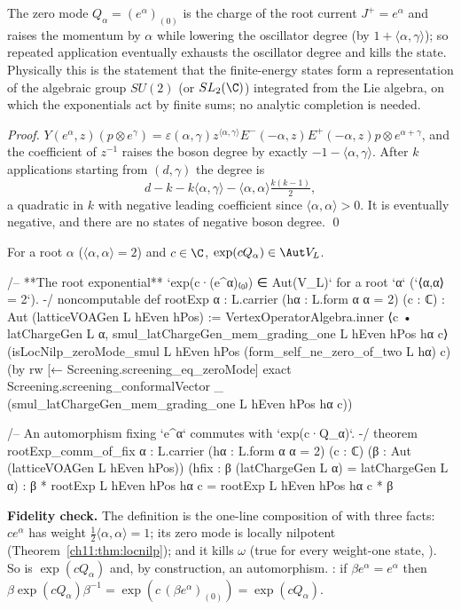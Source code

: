 \begin{physics}
The zero mode $Q_\alpha=(e^\alpha)_{(0)}$ is the charge of the root current $J^+=e^\alpha$ and raises the momentum by $\alpha$ while lowering the oscillator degree (by $1+\langle\alpha,\gamma\rangle$); so repeated application eventually exhausts the oscillator degree and kills the state. Physically this is the statement that the finite-energy states form a representation of the algebraic group $SU(2)$ (or $SL_2(\C)$) integrated from the Lie algebra, on which the exponentials act by finite sums; no analytic completion is needed.
\end{physics}
\emph{Proof.}  $Y(e^\alpha,z)(p\otimes e^\gamma)=\varepsilon(\alpha,\gamma)z^{\langle\alpha,\gamma\rangle}
E^-(-\alpha,z)E^+(-\alpha,z)p\otimes e^{\alpha+\gamma}$, and the coefficient of $z^{-1}$ raises the
boson degree by exactly $-1-\langle\alpha,\gamma\rangle$.  After $k$ applications starting from
$(d,\gamma)$ the degree is
\begin{equation*}
  d-k-k\langle\alpha,\gamma\rangle-\langle\alpha,\alpha\rangle\tfrac{k(k-1)}2 ,
\end{equation*}
a quadratic in $k$ with negative leading coefficient since $\langle\alpha,\alpha\rangle>0$.  It is
eventually negative, and there are no states of negative boson degree. \qed

\begin{definition}\label{ch11:def:rootexp}
For a root $\alpha$ ($\langle\alpha,\alpha\rangle=2$) and $c\in\C$, $\exp(cQ_\alpha)\in\Aut V_L$.
\end{definition}
\begin{leancode}
/-- **The root exponential** `exp(c·(e^α)₍₀₎) ∈ Aut(V_L)` for a root `α` (`⟨α,α⟩ = 2`). -/
noncomputable def rootExp {α : L.carrier} (hα : L.form α α = 2) (c : ℂ) :
    Aut (latticeVOAGen L hEven hPos) :=
  VertexOperatorAlgebra.inner ⟨c • latChargeGen L α, smul_latChargeGen_mem_grading_one L hEven hPos hα c⟩
    (isLocNilp_zeroMode_smul L hEven hPos (form_self_ne_zero_of_two L hα) c)
    (by
      rw [← Screening.screening_eq_zeroMode]
      exact Screening.screening_conformalVector _ (smul_latChargeGen_mem_grading_one L hEven hPos hα c))

/-- An automorphism fixing `e^α` commutes with `exp(c·Q_α)`. -/
theorem rootExp_comm_of_fix {α : L.carrier} (hα : L.form α α = 2) (c : ℂ)
    (β : Aut (latticeVOAGen L hEven hPos)) (hfix : β (latChargeGen L α) = latChargeGen L α) :
    β * rootExp L hEven hPos hα c = rootExp L hEven hPos hα c * β
\end{leancode}
\begin{dictionary}
\textbf{Fidelity check.}  The definition is the one-line composition of  with three
facts: $ce^\alpha$ has weight $\tfrac12\langle\alpha,\alpha\rangle=1$; its zero mode is locally
nilpotent (Theorem~\ref{ch11:thm:locnilp}); and it kills $\omega$ (true for every weight-one
state, ).  So  is $\exp(cQ_\alpha)$ and, by
construction, an automorphism.  : if $\beta e^\alpha=e^\alpha$ then
$\beta\exp(cQ_\alpha)\beta^{-1}=\exp(c\,(\beta e^\alpha)_{(0)})=\exp(cQ_\alpha)$.
\end{dictionary}

